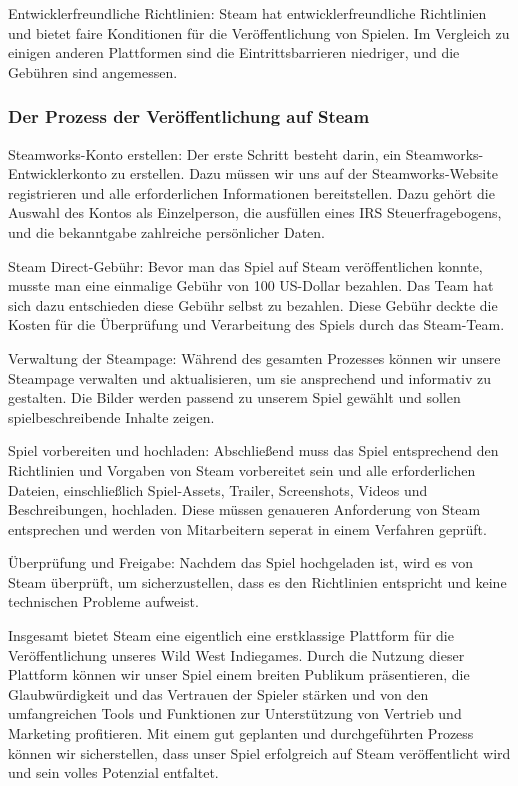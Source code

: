 Entwicklerfreundliche Richtlinien: Steam hat entwicklerfreundliche Richtlinien und bietet faire Konditionen für die Veröffentlichung von Spielen. Im Vergleich zu einigen anderen Plattformen sind die Eintrittsbarrieren niedriger, und die Gebühren sind angemessen.

\subsubsection{Der Prozess der Veröffentlichung auf Steam}\label{subsubsec:Veröffentlichungsprozess}

Steamworks-Konto erstellen: Der erste Schritt besteht darin, ein Steamworks-Entwicklerkonto zu erstellen. Dazu müssen wir uns auf der Steamworks-Website registrieren und alle erforderlichen Informationen bereitstellen. Dazu gehört die Auswahl des Kontos als Einzelperson, die ausfüllen eines IRS Steuerfragebogens, und die bekanntgabe zahlreiche persönlicher Daten.

Steam Direct-Gebühr: Bevor man das Spiel auf Steam veröffentlichen konnte, musste man eine einmalige Gebühr von 100 US-Dollar bezahlen. Das Team hat sich dazu entschieden diese Gebühr selbst zu bezahlen. Diese Gebühr deckte die Kosten für die Überprüfung und Verarbeitung des Spiels durch das Steam-Team.

Verwaltung der Steampage: Während des gesamten Prozesses können wir unsere Steampage verwalten und aktualisieren, um sie ansprechend und informativ zu gestalten. Die Bilder werden passend zu unserem Spiel gewählt und sollen spielbeschreibende Inhalte zeigen.


Spiel vorbereiten und hochladen: Abschließend muss das Spiel entsprechend den Richtlinien und Vorgaben von Steam vorbereitet sein und alle erforderlichen Dateien, einschließlich Spiel-Assets, Trailer, Screenshots, Videos und Beschreibungen, hochladen. Diese müssen genaueren Anforderung von Steam entsprechen und werden von Mitarbeitern seperat in einem Verfahren geprüft.

Überprüfung und Freigabe: Nachdem das Spiel hochgeladen ist, wird es von Steam überprüft, um sicherzustellen, dass es den Richtlinien entspricht und keine technischen Probleme aufweist.

Insgesamt bietet Steam eine eigentlich eine erstklassige Plattform für die Veröffentlichung unseres Wild West Indiegames.
Durch die Nutzung dieser Plattform können wir unser Spiel einem breiten Publikum präsentieren, die Glaubwürdigkeit und das Vertrauen der Spieler stärken und von den
umfangreichen Tools und Funktionen zur Unterstützung von Vertrieb und Marketing profitieren.
Mit einem gut geplanten und durchgeführten Prozess können wir sicherstellen, dass unser Spiel erfolgreich auf Steam veröffentlicht wird und sein volles Potenzial entfaltet.

